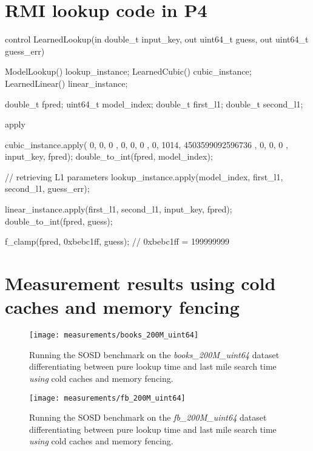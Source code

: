 \section{RMI lookup code in P4}
\label{sect:appendix:rmi_lookup}

\begin{P4}
control LearnedLookup(in double_t input_key, out uint64_t guess, out uint64_t guess_err) {
  ModelLookup() lookup_instance;
  LearnedCubic() cubic_instance;
  LearnedLinear() linear_instance;

  double_t fpred;
  uint64_t model_index;
  double_t first_l1; double_t second_l1;

  apply {
    cubic_instance.apply({ 0, 0, 0 }, { 0, 0, 0 }, { 0, 1014, 4503599092596736 }, { 0, 0, 0 }, input_key, fpred);
    double_to_int(fpred, model_index);

    // retrieving L1 parameters
    lookup_instance.apply(model_index, first_l1, second_l1, guess_err);

    linear_instance.apply(first_l1, second_l1, input_key, fpred);
    double_to_int(fpred, guess);

    f_clamp(fpred, 0xbebc1ff, guess); // 0xbebc1ff = 199999999
  }
}\end{P4}

\section{Measurement results using cold caches and memory fencing}
\label{sect:appendix:measurements}

\begin{figure}[ht]
  \centering
  \texttt{[image: measurements/books\_200M\_uint64]}
  \caption[Lookup and last mile search time measures using cold caches and memory fencing]{
    Running the SOSD benchmark on the \emph{books\_200M\_uint64} dataset differentiating between pure lookup time and last mile search time \emph{using} cold caches and memory fencing.
  }
\end{figure}

\begin{figure}[ht]
  \centering
  \texttt{[image: measurements/fb\_200M\_uint64]}
  \caption[Lookup and last mile search time measures using cold caches and memory fencing]{
    Running the SOSD benchmark on the \emph{fb\_200M\_uint64} dataset differentiating between pure lookup time and last mile search time \emph{using} cold caches and memory fencing.
  }
\end{figure}

